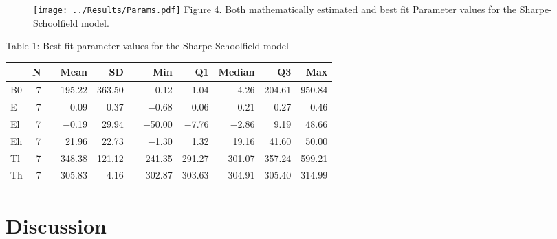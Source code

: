 \documentclass[12pt]{article}\usepackage[]{graphicx}\usepackage[]{color}
\begin{document}
  \begin{figure}[]
    \texttt{[image: ../Results/Params.pdf]}
    Figure 4. Both mathematically estimated and best fit Parameter values for the Sharpe-Schoolfield model.
  \end{figure}

  \begin{table}
    Table 1: Best fit parameter values for the Sharpe-Schoolfield model
\begin{center}
\begin{longtable}{lrrrrrrrrrr}
  \toprule
   & N &   & Mean & SD &   & Min & Q1 & Median & Q3 & Max \\ 
    \cmidrule{2-2}  \cmidrule{4-5} \cmidrule{7-11}
 \endhead
B0 &   7 &  & 195.22 & 363.50 &  & 0.12 & 1.04 & 4.26 & 204.61 & 950.84 \\ 
  E &   7 &  & 0.09 & 0.37 &  & $-$0.68 & 0.06 & 0.21 & 0.27 & 0.46 \\ 
  El &   7 &  & $-$0.19 & 29.94 &  & $-$50.00 & $-$7.76 & $-$2.86 & 9.19 & 48.66 \\ 
  Eh &   7 &  & 21.96 & 22.73 &  & $-$1.30 & 1.32 & 19.16 & 41.60 & 50.00 \\ 
  Tl &   7 &  & 348.38 & 121.12 &  & 241.35 & 291.27 & 301.07 & 357.24 & 599.21 \\ 
  Th &   7 &  & 305.83 & 4.16 &  & 302.87 & 303.63 & 304.91 & 305.40 & 314.99 \\ 
   \bottomrule
\end{longtable}
\end{center}

  \end{table}


  \section{Discussion}
\end{document}
